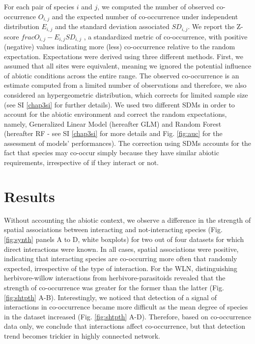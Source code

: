 For each pair of species \(i\) and \(j\), we computed the number of
observed co-occurrence \(O_{i,j}\) and the expected number of
co-occurrence under independent distribution \(E_{i,j}\) and the
standard deviation associated \(SD_{i,j}\). We report the Z-score
\(frac{O_{i,j}-E_{i,j}}{SD_{i,j}}\) \citep{Gilpin1982}, a standardized
metric of co-occurrence, with positive (negative) values indicating more
(less) co-occurrence relative to the random expectation. Expectations
were derived using three different methods. First, we assumed that all
sites were equivalent, meaning we ignored the potential influence of
abiotic conditions across the entire range. The observed co-occurrence
is an estimate computed from a limited number of observations
\citep{Gilpin1982, Veech2013} and therefore, we also considered an
hypergeometric distribution, which corrects for limited sample size (see
SI \ref{chap3si} for further details). We used two different SDMs in
order to account for the abiotic environment and correct the random
expectations, namely, Generalized Linear Model (hereafter GLM) and
Random Forest (hereafter RF - see SI \ref{chap3si} for more details and
Fig. \ref{fig:auc} for the assessment of models' performances). The
correction using SDMs accounts for the fact that species may co-occur
simply because they have similar abiotic requirements, irrespective of
if they interact or not.

\section{Results}\label{results}

Without accounting the abiotic context, we observe a difference in the
strength of spatial associations between interacting and not-interacting
species (Fig. \ref{fig:synth} panels A to D, white boxplots) for two out
of four datasets for which direct interactions were known. In all cases,
spatial associations were positive, indicating that interacting species
are co-occurring more often that randomly expected, irrespective of the
type of interaction. For the WLN, distinguishing herbivore-willow
interactions from herbivore-parasitoids revealed that the strength of
co-occurrence was greater for the former than the latter (Fig.
\ref{fig:shtpth} A-B). Interestingly, we noticed that detection of a
signal of interactions in co-occurrence became more difficult as the
mean degree of species in the dataset increased (Fig. \ref{fig:shtpth}
A-D). Therefore, based on co-occurrence data only, we conclude that
interactions affect co-occurrence, but that detection trend becomes
trickier in highly connected network.

